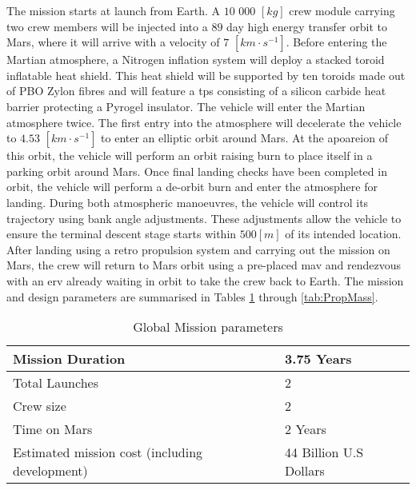 The mission starts at launch from Earth. A $10$ $000$ $[kg]$ crew module carrying two crew members will be injected into a $89$ day high energy transfer orbit to Mars, where it will arrive with a velocity of $7$ $[km\cdot s^{-1}]$. Before entering the Martian atmosphere, a Nitrogen inflation system will deploy a stacked toroid inflatable heat shield. This heat shield will be supported by ten toroids made out of PBO Zylon\textsuperscript{\textregistered} fibres and will feature a \gls{tps} consisting of a silicon carbide heat barrier protecting a Pyrogel\textsuperscript{\textregistered} insulator. The vehicle will enter the Martian atmosphere twice. The first entry into the atmosphere will decelerate the vehicle to $4.53$ $[km\cdot s^{-1}]$ to enter an elliptic orbit around Mars. At the apoareion of this orbit, the vehicle will perform an orbit raising burn to place itself in a parking orbit around Mars. Once final landing checks have been completed in orbit, the vehicle will perform a de-orbit burn and enter the atmosphere for landing. During both atmospheric manoeuvres, the vehicle will control its trajectory using bank angle adjustments. These adjustments allow the vehicle to ensure the terminal descent stage starts within $500 \left[m\right]$ of its intended location. After landing using a retro propulsion system and carrying out the mission on Mars, the crew will return to Mars orbit using a pre-placed \gls{mav} and rendezvous with an \gls{erv} already waiting in orbit to take the crew back to Earth. The mission and design parameters are summarised in Tables \ref{tab:MissionPar} through \ref{tab:PropMass}.


\begin{table}[H]
	\centering
	\caption{Global Mission parameters}
	\label{tab:MissionPar}
	\begin{tabular}{|p{}|p{}|} \hline
		Mission Duration				             	& 	3.75 Years						\\ \hline 
		Total Launches       							&	2  		   	  					\\ \hline
		Crew size				 						&	2     	  						\\ \hline
		Time on Mars				              	   	&  	2 Years    						\\ \hline
		Estimated mission cost (including development) 	&  	44 Billion U.S Dollars			\\ \hline
	\end{tabular}
\end{table}

